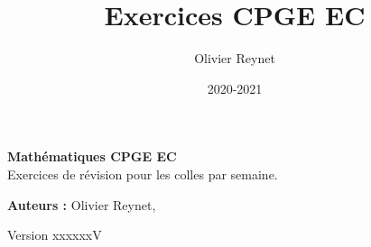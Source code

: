 \documentclass[french,12pt,a4paper]{book}
\author{Olivier Reynet}
\title{Exercices CPGE EC}
\date{2020-2021}
\begin{document}
	
	\begin{titlepage}
		\begin{center}
			\vspace*{5cm}
			
			\textbf{\Huge Mathématiques CPGE EC\\}
					   \vspace{1cm}
			Exercices de révision pour les colles par semaine. 

							\vfill
			
			\textbf{Auteurs : } Olivier Reynet, 
			

					\vfill
		
			

	
			\date{}
		   \vspace{0.5cm}
			Version xxxxxxV
			\vspace{1.5cm}
		\end{center}
	\end{titlepage}
	
	\maketitle
	\tableofcontents
	
	
	
	
	
	
    
\end{document}
